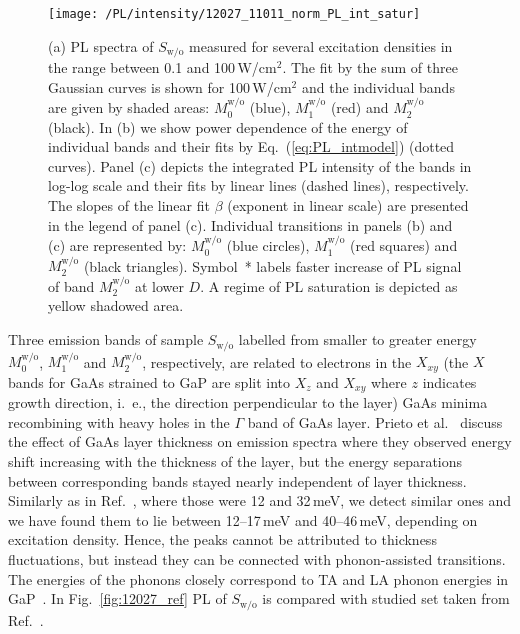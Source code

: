 \begin{figure}
	\centering
	\texttt{[image: /PL/intensity/12027\_11011\_norm\_PL\_int\_satur]}
	\caption{(a) PL spectra of $S_\mathrm{w/o}$ measured for several excitation densities in the range between 0.1 and 100$\,$W/cm$^2$. The fit by the sum of three Gaussian curves is shown for 100$\,$W/cm$^2$ and the individual bands are given by shaded areas: $M_0^\mathrm{w/o}$ (blue), $M_1^\mathrm{w/o}$ (red) and $M_2^\mathrm{w/o}$ (black). In (b) we show power dependence of the energy of individual bands and their fits by Eq.~(\ref{eq:PL_intmodel}) (dotted curves). Panel (c) depicts the integrated PL intensity of the bands in log-log scale and their fits by linear lines (dashed lines), respectively. The slopes of the linear fit $\beta$ (exponent in linear scale) are presented in the legend of panel (c). Individual transitions in panels (b) and (c) are represented by: $M_0^\mathrm{w/o}$ (blue circles), $M_1^\mathrm{w/o}$ (red squares) and $M_2^\mathrm{w/o}$ (black triangles). Symbol~* labels faster increase of PL signal of band $M_2^\mathrm{w/o}$ at lower $D$. A regime of PL saturation is depicted as yellow shadowed area.}
	\label{fig:QD_wo_int}
\end{figure}
%
Three emission bands of sample $S_\mathrm{w/o}$ labelled from smaller to greater energy $M_0^\mathrm{w/o}$, $M_1^\mathrm{w/o}$ and $M_2^\mathrm{w/o}$, respectively, are related to electrons in the $X_{xy}$ (the $X$ bands for GaAs strained to GaP are split into $X_z$ and $X_{xy}$ where $z$ indicates growth direction, i.~e., the direction perpendicular to the layer) GaAs minima recombining with heavy holes in the $\Gamma$ band of GaAs layer. Prieto et al.~\citep{Prieto_APL1997} discuss the effect of GaAs layer thickness on emission spectra where they observed energy shift increasing with the thickness of the layer, but the energy separations between corresponding bands stayed nearly independent of layer thickness. Similarly as in Ref.~\citep{Prieto_APL1997}, where those were 12 and 32$\,$meV, we detect similar ones and we have found them to lie between 12--17$\,$meV and 40--46$\,$meV, depending on excitation density. Hence, the peaks cannot be attributed to thickness fluctuations, but instead they can be connected with phonon-assisted transitions. The energies of the phonons closely correspond to TA and LA phonon energies in GaP~\citep{Prieto_APL1997}. In Fig.~\ref{fig:12027_ref} PL of $S_\mathrm{w/o}$ is compared with studied set taken from Ref.~\citep{Prieto_APL1997}.



